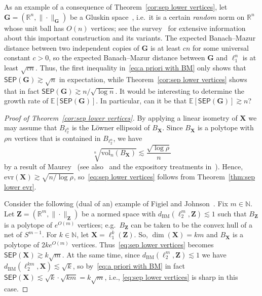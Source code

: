 \documentclass[11pt,reqno]{amsart}
\newcommand{\evr}{\mathrm{evr}}
\newcommand{\X}{\mathbf X}
\newcommand{\R}{\mathbb R}
\theoremstyle{remark}
\newcommand{\E}{\mathbb{ E}}
\newcommand{\N}{\mathbb N}
\newcommand{\BM}{\mathrm{BM}}
\newcommand{\bfZ}{\mathbf{Z}}
\newcommand{\vol}{\mathrm{vol}}
\renewcommand{\1}{\mathbf 1}
\newcommand{\sep}{\mathsf{SEP}}
\begin{document}
As an example of a consequence of Theorem~\ref{cor:sep lower vertices}, let $\mathbf{G}=(\R^n,\|\cdot\|_{\mathbf{G}})$ be a  Gluskin space~\cite{Glu81}, i.e.~it is a certain {\em random} norm on $\R^n$ whose unit ball has $O(n)$ vertices; see the survey~\cite{MTJ03} for extensive information about this important construction and its variants. The expected Banach--Mazur distance between two independent copies of $\mathbf{G}$ is at least $cn$ for some universal constant $c>0$, so the expected Banach--Mazur distance between $\mathbf{G}$ and $\ell_1^n$ is at least $\sqrt{cn}$. Thus, the first inequality in~\eqref{eq:a priori with BM} only shows that $\sep(\mathbf{G})\gtrsim \sqrt{n}$ in expectation, while Theorem~\ref{cor:sep lower vertices} shows that in fact $\sep(\mathbf{G})\gtrsim n/\sqrt{\log n}$. It would be interesting to determine the growth rate of $\E[\sep(\mathbf{G})]$. In particular, can it be that $\E[\sep(\mathbf{G})]\gtrsim n$?

\begin{proof}[Proof of Theorem~\ref{cor:sep lower vertices}] By applying a linear isometry of  $\X$ we may assume that $B_{\ell_2^n}$ is the L\"owner ellipsoid of $B_{\X}$. Since $B_\X$ is a polytope with $\rho n$ vertices that is contained in $B_{\ell_2^n}$, we have $$\sqrt[n]{\vol_n(B_{\X})}\lesssim \frac{\sqrt{\log \rho}}{n}$$
by a  result  of Maurey~\cite{Pis81} (see also~\cite{Car85,BF87,CP88,Glu88,BLM89,BP90,Kyr00} and  the expository treatments  in~\cite{Bal01,BGVV14}). Hence, $\evr(\X)\gtrsim \sqrt{n/\log \rho}$, so~\eqref{eq:sep lower vertices} follows from Theorem~\ref{thm:sep lower evr}.

Consider the following (dual of an) example of Figiel and Johnson~\cite{FJ80}. Fix $m\in \N$. Let $\bfZ=(\R^m,\|\cdot\|_\bfZ)$ be a normed space with $d_{\BM}(\ell_2^m,\bfZ)\lesssim 1$ such that $B_\bfZ$ is a polytope of $e^{O(m)}$ vertices; e.g.~$B_{\bfZ}$ can be taken to be the convex hull of a net of $S^{m-1}$. For $k\in \N$, let $\X=\ell_1^k(\bfZ)$. So, $\dim(\X)=km$ and $B_{\X}$ is a polytope of $2ke^{O(m)}$ vertices.  Thus~\eqref{eq:sep lower vertices} becomes $\sep(\X)\gtrsim k\sqrt{m}$. At the same time, since $d_{\BM}(\ell_2^m,\bfZ)\lesssim 1$ we have $d_{\BM}(\ell_2^{km},\X)\lesssim \sqrt{k}$, so by~\eqref{eq:a priori with BM} in fact $\sep(\X)\lesssim \sqrt{k} \cdot\sqrt{km} =k\sqrt{m}$, i.e., \eqref{eq:sep lower vertices}  is sharp in this case.
\end{proof}
\end{document}
